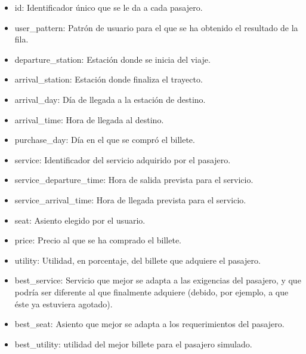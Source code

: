 \begin{itemize}
    \item id: Identificador único que se le da a cada pasajero.
    \item user\_pattern: Patrón de usuario para el que se ha obtenido el resultado de la fila.
    \item departure\_station: Estación donde se inicia del viaje.
    \item arrival\_station: Estación donde finaliza el trayecto.
    \item arrival\_day: Día de llegada a la estación de destino.
    \item arrival\_time: Hora de llegada al destino.
    \item purchase\_day: Día en el que se compró el billete.
    \item service: Identificador del servicio adquirido por el pasajero.
    \item service\_departure\_time: Hora de salida prevista para el servicio. 
    \item service\_arrival\_time: Hora de llegada prevista para el servicio.
    \item seat: Asiento elegido por el usuario.
    \item price: Precio al que se ha comprado el billete.
    \item utility: Utilidad, en porcentaje, del billete que adquiere el pasajero.
    \item best\_service: Servicio que mejor se adapta a las exigencias del pasajero, y que podría ser diferente al que finalmente adquiere (debido, por ejemplo, a que éste ya estuviera agotado).
    \item best\_seat: Asiento que mejor se adapta a los requerimientos del pasajero.
    \item best\_utility: utilidad del mejor billete para el pasajero simulado.
\end{itemize}


